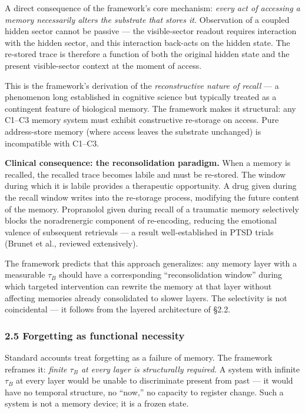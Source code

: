 \documentclass[
]{article}
\begin{document}
A direct consequence of the framework's core mechanism: \emph{every act
of accessing a memory necessarily alters the substrate that stores it.}
Observation of a coupled hidden sector cannot be passive --- the
visible-sector readout requires interaction with the hidden sector, and
this interaction back-acts on the hidden state. The re-stored trace is
therefore a function of both the original hidden state and the present
visible-sector context at the moment of access.

This is the framework's derivation of the \emph{reconstructive nature of
recall} --- a phenomenon long established in cognitive science but
typically treated as a contingent feature of biological memory. The
framework makes it structural: any C1--C3 memory system must exhibit
constructive re-storage on access. Pure address-store memory (where
access leaves the substrate unchanged) is incompatible with C1--C3.

\textbf{Clinical consequence: the reconsolidation paradigm.} When a
memory is recalled, the recalled trace becomes labile and must be
re-stored. The window during which it is labile provides a therapeutic
opportunity. A drug given during the recall window writes into the
re-storage process, modifying the future content of the memory.
Propranolol given during recall of a traumatic memory selectively blocks
the noradrenergic component of re-encoding, reducing the emotional
valence of subsequent retrievals --- a result well-established in PTSD
trials (Brunet et al., reviewed extensively).

The framework predicts that this approach generalizes: any memory layer
with a measurable \(\tau_B\) should have a corresponding
``reconsolidation window'' during which targeted intervention can
rewrite the memory at that layer without affecting memories already
consolidated to slower layers. The selectivity is not coincidental ---
it follows from the layered architecture of §2.2.

\hypertarget{forgetting-as-functional-necessity}{%
\subsubsection{2.5 Forgetting as functional
necessity}\label{forgetting-as-functional-necessity}}

Standard accounts treat forgetting as a failure of memory. The framework
reframes it: \emph{finite \(\tau_B\) at every layer is structurally
required.} A system with infinite \(\tau_B\) at every layer would be
unable to discriminate present from past --- it would have no temporal
structure, no ``now,'' no capacity to register change. Such a system is
not a memory device; it is a frozen state.
\end{document}
